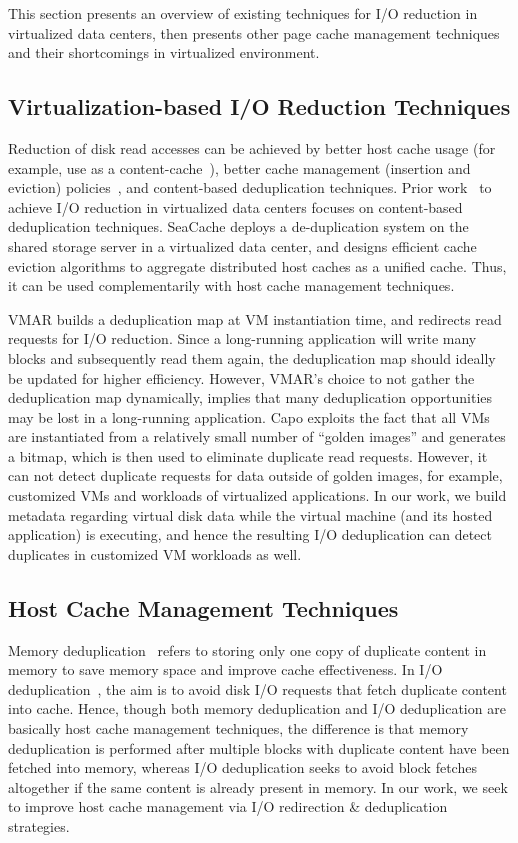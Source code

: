 
This section presents an overview
of existing techniques for I/O reduction in virtualized data centers,
then presents other page cache management techniques and their
shortcomings in virtualized environment.

\subsection{Virtualization-based I/O Reduction Techniques}
Reduction of disk read accesses can be achieved by 
better host cache usage (for example, use as a content-cache~\cite{iodedup}),
better cache management 
(insertion and eviction) policies~\cite{outperforming-LRU}, 
and content-based deduplication techniques.
Prior work~\cite{cooperative, VMAR, capo} to achieve I/O reduction in 
virtualized data centers focuses on content-based deduplication techniques.
SeaCache\cite{cooperative} deploys a de-duplication
system on the shared storage server in a virtualized data center, and
designs efficient cache eviction algorithms to aggregate distributed
host caches as a unified cache. Thus, it can be used
complementarily with host cache management techniques.

VMAR\cite{VMAR} builds a deduplication map at VM instantiation
time, and redirects read requests for I/O reduction.
Since a long-running application will write many blocks and subsequently
read them again, the deduplication map should ideally be updated for
higher efficiency. However, VMAR's choice to not gather the deduplication 
map dynamically, implies that many
deduplication opportunities may be lost in a long-running application.
Capo\cite{capo} exploits the fact that all VMs are instantiated
from a relatively small number of ``golden images'' and generates a bitmap,
which is then used to eliminate duplicate read requests. However, it
can not detect duplicate requests for data outside of golden images,
for example, customized VMs and workloads of
virtualized applications.
In our work, we build metadata regarding virtual disk data while
the virtual machine (and its hosted application) is executing, and hence
the resulting I/O deduplication can detect duplicates in customized
VM workloads as well.

\subsection{Host Cache Management Techniques}
Memory deduplication~\cite{satori, memorybuddies, difference-engine, singleton}
refers to storing only one copy of duplicate content in memory to 
save memory space and improve cache effectiveness. 
In I/O deduplication~\cite{iodedup}, the aim is to avoid disk I/O requests
that fetch duplicate content into cache. Hence, though both
memory deduplication and I/O deduplication are basically host cache
management techniques\cite{cooperative}, the difference is that
memory deduplication is performed after multiple blocks with duplicate
content have been fetched into memory, whereas I/O deduplication seeks to
avoid block fetches altogether if the same content is already present
in memory. In our work, we seek to improve host cache management via
I/O redirection \& deduplication strategies.

